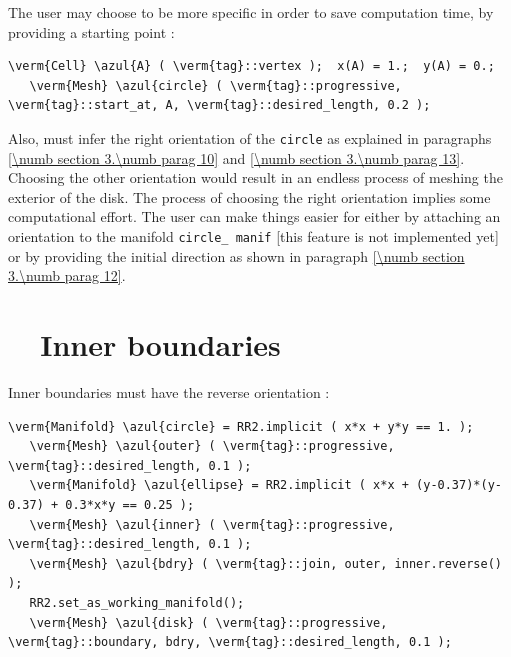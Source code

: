 The user may choose to be more specific in order to save computation time,
by providing a starting point :

\begin{Verbatim}[commandchars=\\\{\},formatcom=\small\tt,
   baselinestretch=0.94,framesep=2mm                      ]
   \verm{Cell} \azul{A} ( \verm{tag}::vertex );  x(A) = 1.;  y(A) = 0.;
   \verm{Mesh} \azul{circle} ( \verm{tag}::progressive, \verm{tag}::start_at, A, \verm{tag}::desired_length, 0.2 );
\end{Verbatim}

Also, {\maniFEM} must infer the right orientation of the {\small\tt circle}
as explained in paragraphs \ref{\numb section 3.\numb parag 10} and
\ref{\numb section 3.\numb parag 13}.
Choosing the other orientation would result in an endless process of meshing the exterior of
the disk.
The process of choosing the right orientation implies some computational effort.
The user can make things easier for {\maniFEM} either by attaching an orientation
to the manifold {\small\tt circle\_\,manif} [this feature is not implemented yet] or
by providing the initial direction as shown in paragraph \ref{\numb section 3.\numb parag 12}.


\section{~~Inner boundaries}\label{\numb section 3.\numb parag 3}

Inner boundaries must have the reverse orientation :

\begin{Verbatim}[commandchars=\\\{\},formatcom=\small\tt,frame=single,
   label=parag-\ref{\numb section 3.\numb parag 3}.cpp,rulecolor=\color{coment},
   baselinestretch=0.94,framesep=2mm                                            ]
   \verm{Manifold} \azul{circle} = RR2.implicit ( x*x + y*y == 1. );
   \verm{Mesh} \azul{outer} ( \verm{tag}::progressive, \verm{tag}::desired_length, 0.1 );
   \verm{Manifold} \azul{ellipse} = RR2.implicit ( x*x + (y-0.37)*(y-0.37) + 0.3*x*y == 0.25 );
   \verm{Mesh} \azul{inner} ( \verm{tag}::progressive, \verm{tag}::desired_length, 0.1 );
   \verm{Mesh} \azul{bdry} ( \verm{tag}::join, outer, inner.reverse() );
   RR2.set_as_working_manifold();
   \verm{Mesh} \azul{disk} ( \verm{tag}::progressive, \verm{tag}::boundary, bdry, \verm{tag}::desired_length, 0.1 );
\end{Verbatim}

